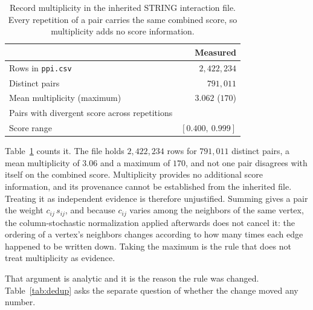 \documentclass[Ingles]{ic-tese-v3}
\def\textBF#1{\sbox\CBox{#1}\resizebox{\wd\CBox}{\ht\CBox}{\textbf{#1}}}
\begin{document}
\begin{table}[!htb]
  \centering
    \caption{Record multiplicity in the inherited STRING interaction file. Every repetition of a
  pair carries the same combined score, so multiplicity adds no score information.}
  \label{tab:rede_ppi}
  \begin{tabular}{lr}
    \toprule
    & Measured \\
    \midrule
    Rows in \texttt{ppi.csv} & $2{,}422{,}234$ \\
    Distinct pairs & $791{,}011$ \\
    Mean multiplicity (maximum) & $3.062$ ($170$) \\
    Pairs with divergent score across repetitions & \textBF{$0$} \\
    Score range & $[0.400,\ 0.999]$ \\
    \bottomrule
  \end{tabular}
\end{table}

Table~\ref{tab:rede_ppi} counts it. The file holds $2{,}422{,}234$ rows for $791{,}011$
distinct pairs, a mean multiplicity of $3.06$ and a maximum of $170$, and not one
pair disagrees with itself on the combined score. Multiplicity provides no additional score information, and its provenance cannot be established from the inherited file. Treating it as independent evidence is therefore unjustified. Summing gives a pair
the weight $c_{ij}\,s_{ij}$, and because $c_{ij}$ varies among the neighbors of the same
vertex, the column-stochastic normalization applied afterwards does not cancel it: the
ordering of a vertex's neighbors changes according to how many times each edge happened to
be written down. Taking the maximum is the rule that does not treat multiplicity as evidence.

That argument is analytic and it is the reason the rule was changed.
Table~\ref{tab:dedup} asks the separate question of whether the change moved any number.
\end{document}
